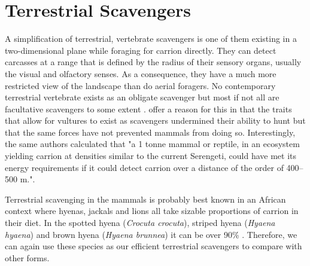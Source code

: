 \documentclass[a4paper,12pt]{article}
\begin{document}
\section*{Terrestrial Scavengers}
A simplification of terrestrial, vertebrate scavengers is one of them existing in a two-dimensional plane while foraging for carrion directly. They can detect carcasses at a range that is defined by the radius of their sensory organs, usually the visual and olfactory senses. As a consequence, they have a much more restricted view of the landscape than do aerial foragers. No contemporary terrestrial vertebrate exists as an obligate scavenger but most if not all are facultative scavengers to some extent \citep{beasley2015vertebrates}. \cite{ruxton2004obligate} offer a reason for this in that the traits that allow for vultures to exist as scavengers undermined their ability to hunt but that the same forces have not prevented mammals from doing so. Interestingly, the same authors calculated that "a 1 tonne mammal or reptile, in an ecosystem yielding carrion at densities similar to the current Serengeti, could have met its energy requirements if it could detect carrion over a distance of the order of 400–500 m."\citep{ruxton2004obligate}. 

Terrestrial scavenging in the mammals is probably best known in an African context where hyenas, jackals and lions all take sizable proportions of carrion in their diet. In the spotted hyena (\textit{Crocuta crocuta}), striped hyena (\textit{Hyaena hyaena}) and brown hyena (\textit{Hyaena brunnea}) it can be over 90\% \citep{jones2015african}. Therefore, we can again use these species as our efficient terrestrial scavengers to compare with other forms. 
\end{document}

